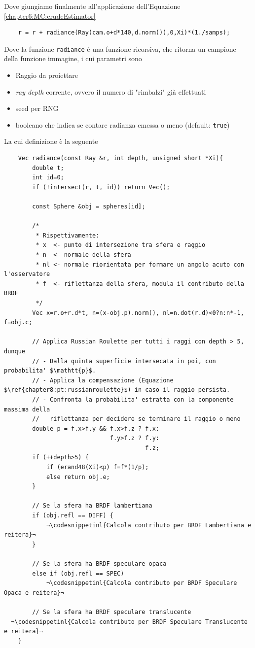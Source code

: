 Dove giungiamo finalmente all'applicazione dell'Equazione \ref{chapter6:MC:crudeEstimator}
\begin{verbatim}
	r = r + radiance(Ray(cam.o+d*140,d.norm()),0,Xi)*(1./samps); 
\end{verbatim}
Dove la funzione \texttt{radiance} \`e una funzione ricorsiva, che ritorna un campione della funzione immagine, i cui parametri sono
\begin{itemize}[topsep=0pt,noitemsep]
	\item Raggio da proiettare
	\item \textit{ray depth} corrente, ovvero il numero di "rimbalzi" gi\`a effettuati
	\item seed per RNG
	\item booleano che indica se contare radianza emessa o meno (default: \texttt{true})
\end{itemize}
La cui definizione \`e la seguente
\begin{verbatim}
	Vec radiance(const Ray &r, int depth, unsigned short *Xi){ 
		double t;
		int id=0;
		if (!intersect(r, t, id)) return Vec();

		const Sphere &obj = spheres[id]; 

		/*
		 * Rispettivamente:
		 * x  <- punto di intersezione tra sfera e raggio
		 * n  <- normale della sfera
		 * nl <- normale riorientata per formare un angolo acuto con l'osservatore
		 * f  <- riflettanza della sfera, modula il contributo della BRDF
		 */
		Vec x=r.o+r.d*t, n=(x-obj.p).norm(), nl=n.dot(r.d)<0?n:n*-1, f=obj.c;

		// Applica Russian Roulette per tutti i raggi con depth > 5, dunque 
		// - Dalla quinta superficie intersecata in poi, con probabilita' $\mathtt{p}$.
		// - Applica la compensazione (Equazione $\ref{chapter8:pt:russianroulette}$) in caso il raggio persista.
		// - Confronta la probabilita' estratta con la componente massima della 
		//   riflettanza per decidere se terminare il raggio o meno
		double p = f.x>f.y && f.x>f.z ? f.x:
		                      f.y>f.z ? f.y:
		                                f.z;
		if (++depth>5) {
			if (erand48(Xi)<p) f=f*(1/p); 
			else return obj.e;
		}

		// Se la sfera ha BRDF lambertiana
		if (obj.refl == DIFF) {
			¬\codesnippetinl{Calcola contributo per BRDF Lambertiana e reitera}¬
		} 

		// Se la sfera ha BRDF speculare opaca
		else if (obj.refl == SPEC)
			¬\codesnippetinl{Calcola contributo per BRDF Speculare Opaca e reitera}¬

		// Se la sfera ha BRDF speculare translucente
  ¬\codesnippetinl{Calcola contributo per BRDF Speculare Translucente e reitera}¬
	}
\end{verbatim}
